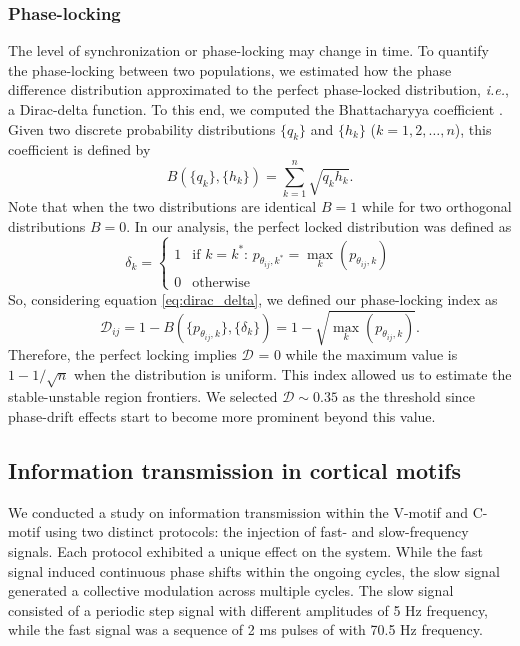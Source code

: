 \documentclass[../main.tex]{subfiles}
\begin{document}
\subsubsection{Phase-locking}
The level of synchronization or phase-locking may change in time.
To quantify the phase-locking between two populations, we estimated how the phase difference distribution approximated to the perfect phase-locked distribution, \textit{i.e.}, a Dirac-delta function.
To this end, we computed the Bhattacharyya coefficient \citep{kailath1967divergence}.
Given two discrete probability distributions $\{q_k\}$ and $\{h_k\}$ ($k=1,2,\ldots,n$), this coefficient is defined by
\begin{equation}
	B(\{q_k\},\{h_k\}) = \sum_{k=1}^n \sqrt{q_kh_k}.
	\label{eq:bhattacharyya_coefficient}
\end{equation}
Note that when the two distributions are identical $B=1$ while for two orthogonal distributions $B=0$.
In our analysis, the perfect locked distribution was defined as
\begin{equation}
	\delta_k = \begin{cases} 1   & \mbox{if } k = k^{*} \mbox{: } p_{\theta_{ij},k^{*}} = \max_{k}{(p_{\theta_{ij},k})}   \\
				         0   & \mbox{otherwise} \end{cases}
	\label{eq:dirac_delta}
\end{equation}
So, considering equation \eqref{eq:dirac_delta}, we defined our phase-locking index as
\begin{equation}
	\mathscr{D}_{ij} = 1- B(\{p_{\theta_{ij},k}\}, \{\delta_k\}) = 1 - \sqrt{ \max_k{ (p_{\theta_{ij},k})} }.
\end{equation} 
Therefore, the perfect locking implies $\mathscr{D}$ = 0 while the maximum value is $1-1/\sqrt{n}$ when the distribution is uniform.
This index allowed us to estimate the stable-unstable region frontiers.
We selected $\mathscr{D} \sim 0.35$ as the threshold since phase-drift effects start to become more prominent beyond this value.

\subsection{Information transmission in cortical motifs}
We conducted a study on information transmission within the V-motif and C-motif using two distinct protocols: the injection of fast- and slow-frequency signals.
Each protocol exhibited a unique effect on the system.
While the fast signal induced continuous phase shifts within the ongoing cycles, the slow signal generated a collective modulation across multiple cycles.
The slow signal consisted of a periodic step signal with different amplitudes of 5 Hz frequency, while the fast signal was a sequence of 2 ms pulses of with 70.5 Hz frequency.
\end{document}
